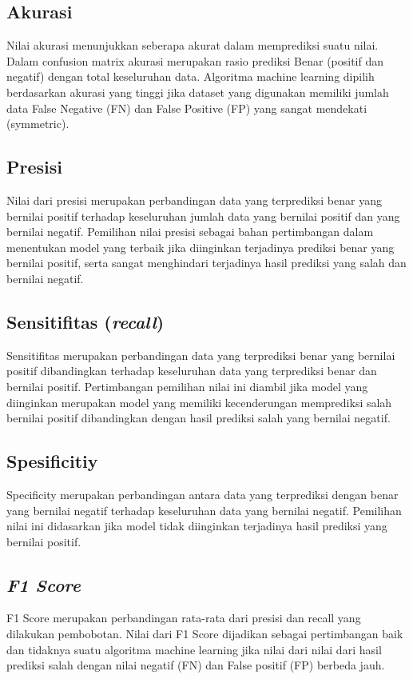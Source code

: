 \subsection{Akurasi}
Nilai akurasi menunjukkan seberapa akurat dalam memprediksi suatu nilai. Dalam 
confusion matrix akurasi merupakan rasio prediksi Benar (positif dan negatif) 
dengan total keseluruhan data. Algoritma machine learning dipilih berdasarkan 
akurasi yang tinggi jika dataset yang digunakan memiliki jumlah data False 
Negative (FN) dan False Positive (FP) yang sangat mendekati (symmetric).

\subsection{Presisi}
Nilai dari presisi merupakan perbandingan data yang terprediksi benar yang 
bernilai positif terhadap keseluruhan jumlah data yang bernilai positif dan 
yang bernilai negatif. Pemilihan nilai presisi sebagai bahan pertimbangan 
dalam 
menentukan model yang terbaik jika diinginkan terjadinya prediksi benar yang 
bernilai positif, serta sangat menghindari terjadinya hasil prediksi yang 
salah 
dan bernilai negatif. 

\subsection{Sensitifitas (\textit{recall})}
Sensitifitas merupakan perbandingan data yang terprediksi benar yang bernilai 
positif dibandingkan terhadap keseluruhan data yang terprediksi benar dan 
bernilai positif. Pertimbangan pemilihan nilai ini diambil jika model yang 
diinginkan merupakan model yang memiliki kecenderungan memprediksi salah 
bernilai positif dibandingkan dengan hasil prediksi salah yang bernilai 
negatif.

\subsection{Spesificitiy}
Specificity merupakan perbandingan antara data yang terprediksi dengan benar 
yang bernilai negatif terhadap keseluruhan data yang bernilai negatif. 
Pemilihan nilai ini didasarkan jika model tidak diinginkan terjadinya hasil 
prediksi yang bernilai positif.

\subsection{\textit{F1 Score}}
F1 Score merupakan perbandingan rata-rata dari presisi dan recall yang dilakukan pembobotan. Nilai dari F1 Score dijadikan sebagai pertimbangan baik dan tidaknya suatu algoritma machine learning jika nilai dari nilai dari hasil prediksi salah dengan nilai negatif (FN) dan False positif (FP) berbeda jauh.

